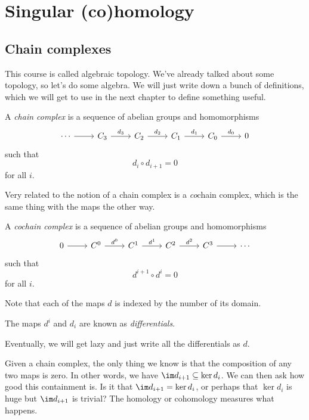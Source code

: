 \documentclass[a4paper]{article}
\theoremstyle{definition}
\begin{document}
\section{Singular (co)homology}
\subsection{Chain complexes}
This course is called algebraic topology. We've already talked about some topology, so let's do some algebra. We will just write down a bunch of definitions, which we will get to use in the next chapter to define something useful.

\begin{defi}
  A \emph{chain complex} is a sequence of abelian groups and homomorphisms
  \[
    \begin{tikzcd}
      \cdots \ar[r] & C_3 \ar[r, "d_3"] & C_2 \ar[r, "d_2"] & C_1 \ar[r, "d_1"] & C_0 \ar[r, "d_0"] & 0
    \end{tikzcd}
  \]
  such that
  \[
    d_i \circ d_{i + 1} = 0
  \]
  for all $i$.
\end{defi}

Very related to the notion of a chain complex is a \emph{co}chain complex, which is the same thing with the maps the other way.

\begin{defi}
  A \emph{cochain complex} is a sequence of abelian groups and homomorphisms
  \[
    \begin{tikzcd}
      0 \ar[r] & C^0 \ar[r, "d^0"] & C^1 \ar[r, "d^1"] & C^2 \ar[r, "d^2"] & C^3 \ar[r] & \cdots
    \end{tikzcd}
  \]
  such that
  \[
    d^{i + 1} \circ d^i = 0
  \]
  for all $i$.
\end{defi}

Note that each of the maps $d$ is indexed by the number of its domain.

\begin{defi}[Differentials]
  The maps $d^i$ and $d_i$ are known as \emph{differentials}.
\end{defi}
Eventually, we will get lazy and just write all the differentials as $d$.

Given a chain complex, the only thing we know is that the composition of any two maps is zero. In other words, we have $\im d_{i+1} \subseteq \ker d_i$. We can then ask how good this containment is. Is it that $\im d_{i + 1} = \ker d_i$, or perhaps that $\ker d_i$ is huge but $\im d_{i + 1}$ is trivial? The homology or cohomology measures what happens.
\end{document}
